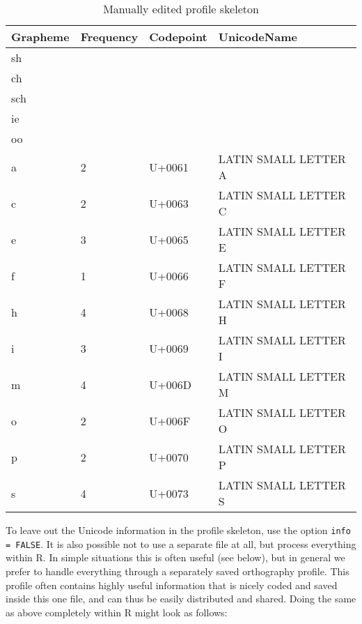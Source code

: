 \documentclass[output=book,nonflat,modfonts,
colorlinks, citecolor=brown,
		]{langsci/langscibook}\usepackage[]{graphicx}\usepackage[]{color}
\begin{document}
\begin{table}[htb]
\centering
\begingroup\scriptsize
\begin{tabular}{llll}
  \toprule
Grapheme & Frequency & Codepoint & UnicodeName \\ 
  \midrule
sh &  &  &  \\ 
  ch &  &  &  \\ 
  sch &  &  &  \\ 
  ie &  &  &  \\ 
  oo &  &  &  \\ 
  a & 2 & U+0061 & LATIN SMALL LETTER A \\ 
  c & 2 & U+0063 & LATIN SMALL LETTER C \\ 
  e & 3 & U+0065 & LATIN SMALL LETTER E \\ 
  f & 1 & U+0066 & LATIN SMALL LETTER F \\ 
  h & 4 & U+0068 & LATIN SMALL LETTER H \\ 
  i & 3 & U+0069 & LATIN SMALL LETTER I \\ 
  m & 4 & U+006D & LATIN SMALL LETTER M \\ 
  o & 2 & U+006F & LATIN SMALL LETTER O \\ 
  p & 2 & U+0070 & LATIN SMALL LETTER P \\ 
  s & 4 & U+0073 & LATIN SMALL LETTER S \\ 
   \bottomrule
\end{tabular}
\endgroup
\caption{Manually edited profile skeleton} 
\label{tab:profile_skeleton1}
\end{table}


To leave out the Unicode information in
the profile skeleton, use the option \texttt{info = FALSE}. It is also
possible not to use a separate file at all, but process everything within R. In
simple situations this is often useful (see below), but in general we prefer to
handle everything through a separately saved orthography profile. This profile
often contains highly useful information that is nicely coded and saved inside
this one file, and can thus be easily distributed and shared. Doing the same as
above completely within R might look as follows:
\end{document}
